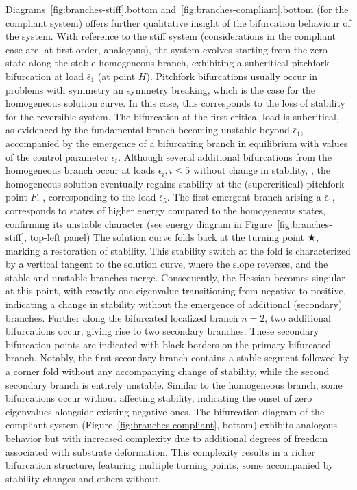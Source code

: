 \documentclass[10pt]{article}
\begin{document}
    {
        Diagrams~\ref{fig:branches-stiff}.bottom and~\ref{fig:branches-compliant}.bottom (for the compliant system) offers further qualitative insight of the bifurcation behaviour of the system.
        With reference to the stiff system (considerations in the compliant case are, at first order, analogous),
        the system evolves starting from the zero state along the stable homogeneous branch, exhibiting a subcritical pitchfork bifurcation at load $\bar \epsilon_1$ (at point $H$).
        Pitchfork bifurcations usually occur in problems with symmetry an symmetry breaking, which is the
        case for the homogeneous solution curve.
        In this case, this corresponds to the loss of stability for the reversible system.
        The bifurcation at the first critical load is subcritical, as evidenced by the fundamental branch becoming unstable beyond $\bar \epsilon_1$, accompanied by the emergence of a bifurcating branch in equilibrium with values of the control parameter $\bar \epsilon_t$.
        Although several additional bifurcations from the homogeneous branch occur at loads $\bar \epsilon_i, i\leq 5$ without change in stability,
        , the homogeneous solution eventually regains stability at the (supercritical) pitchfork point $F$, , corresponding to the load $\bar \epsilon_5$.
        The first emergent branch arising a $\bar \epsilon_1$, corresponds to states of higher energy compared to the homogeneous states, confirming its unstable character (see energy diagram in Figure~\ref{fig:branches-stiff}, top-left panel)
        The solution curve folds back at the turning point $\bigstar$, marking a restoration of stability. This stability switch at the fold is characterized by a vertical tangent to the solution curve, where the slope reverses, and the stable and unstable branches merge. Consequently, the Hessian becomes singular at this point, with exactly one eigenvalue transitioning from negative to positive, indicating a change in stability without the emergence of additional (secondary) branches.
        Further along the bifurcated localized branch $n=2$, two additional bifurcations occur, giving rise to two secondary branches. These secondary bifurcation points are indicated with black borders on the primary bifurcated branch. Notably, the first secondary branch contains a stable segment followed by a corner fold without any accompanying change of stability, while the second secondary branch is entirely unstable.
        Similar to the homogeneous branch, some bifurcations occur without affecting stability, indicating the onset of zero eigenvalues alongside existing negative ones. The bifurcation diagram of the compliant system (Figure~\ref{fig:branches-compliant}, bottom) exhibits analogous behavior but with increased complexity due to additional degrees of freedom associated with substrate deformation. This complexity results in a richer bifurcation structure, featuring multiple turning points, some accompanied by stability changes and others without.
    }
\end{document}
